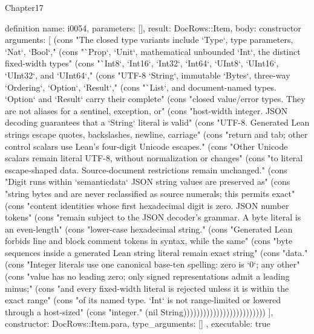\begin{lexlean}{Chapter17}
\begin{semanticmodule}
definition{
  name: i0054,
  parameters: [],
  result: DocRows::Item,
  body: constructor{
    arguments: [
      (cons "The closed type variants include `Type`, type parameters, `Nat`, `Bool`," (cons "`Prop`, `Unit`, mathematical unbounded `Int`, the distinct fixed-width types" (cons "`Int8`, `Int16`, `Int32`, `Int64`, `UInt8`, `UInt16`, `UInt32`, and `UInt64`," (cons "UTF-8 `String`, immutable `Bytes`, three-way `Ordering`, `Option`, `Result`," (cons "`List`, and document-named types. `Option` and `Result` carry their complete" (cons "closed value/error types. They are not aliases for a sentinel, exception, or" (cons "host-width integer. JSON decoding guarantees that a `String` literal is valid" (cons "UTF-8. Generated Lean strings escape quotes, backslashes, newline, carriage" (cons "return and tab; other control scalars use Lean's four-digit Unicode escapes." (cons "Other Unicode scalars remain literal UTF-8, without normalization or changes" (cons "to literal escape-shaped data. Source-document restrictions remain unchanged." (cons "Digit runs within `semanticdata` JSON string values are preserved as" (cons "string bytes and are never reclassified as source numerals; this permits exact" (cons "content identities whose first hexadecimal digit is zero. JSON number tokens" (cons "remain subject to the JSON decoder's grammar. A byte literal is an even-length" (cons "lower-case hexadecimal string." (cons "Generated Lean forbids line and block comment tokens in syntax, while the same" (cons "byte sequences inside a generated Lean string literal remain exact string" (cons "data." (cons "Integer literals use one canonical base-ten spelling: zero is `0`; any other" (cons "value has no leading zero; only signed representations admit a leading minus;" (cons "and every fixed-width literal is rejected unless it is within the exact range" (cons "of its named type. `Int` is not range-limited or lowered through a host-sized" (cons "integer." (nil String)))))))))))))))))))))))))
    ],
    constructor: DocRows::Item.para,
    type_arguments: []
  },
  executable: true
}


\end{semanticmodule}
\end{lexlean}
